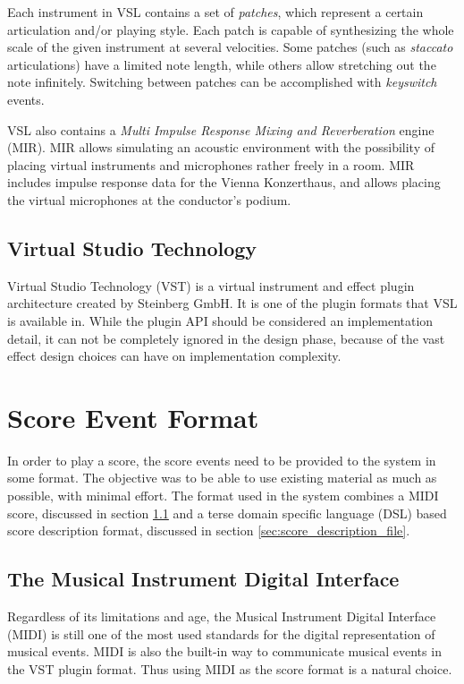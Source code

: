 Each instrument in VSL contains a set of \textit{patches},
which represent a certain articulation and/or playing style.
Each patch is capable of synthesizing
the whole scale of the given instrument at several velocities.
Some patches (such as \textit{staccato} articulations)
have a limited note length,
while others allow stretching out the note infinitely.
Switching between patches can be accomplished with \textit{keyswitch} events.

VSL also contains a \textit{Multi Impulse Response Mixing and Reverberation}
engine (MIR).
MIR allows simulating an acoustic environment with
the possibility of placing virtual instruments and microphones
rather freely in a room.
MIR includes impulse response data for the Vienna Konzerthaus,
and allows placing the virtual microphones at the conductor's podium.

\subsection{Virtual Studio Technology}
\label{sec:vst}

Virtual Studio Technology (VST) \cite{VST} is
a virtual instrument and effect plugin architecture created by Steinberg GmbH.
It is one of the plugin formats that VSL is available in.
While the plugin API should be considered an implementation detail,
it can not be completely ignored in the design phase,
because of the vast effect design choices can have on implementation complexity.

\section{Score Event Format}

In order to play a score,
the score events need to be provided to the system in some format.
The objective was to be able to use existing material as much as possible,
with minimal effort.
The format used in the system combines
a MIDI score, discussed in section \ref{sec:midi} and
a terse domain specific language (DSL) based score description format,
discussed in section \ref{sec:score_description_file}.

\subsection{The Musical Instrument Digital Interface}
\label{sec:midi}

Regardless of its limitations and age,
the Musical Instrument Digital Interface (MIDI)
is still one of the most used standards
for the digital representation of musical events.
MIDI is also the built-in way to communicate musical events
in the VST plugin format.
Thus using MIDI as the score format is a natural choice.

